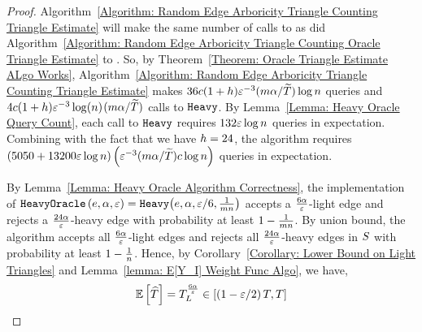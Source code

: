 \begin{proof}
    Algorithm~\ref{Algorithm: Random Edge Arboricity Triangle Counting Triangle Estimate} will make the same number of calls to \heavyoracle{} as did Algorithm~\ref{Algorithm: Random Edge Arboricity Triangle Counting Oracle Triangle Estimate} to \exactheavyoracle{}. So, by Theorem~\ref{Theorem: Oracle Triangle Estimate ALgo Works}, Algorithm~\ref{Algorithm: Random Edge Arboricity Triangle Counting Triangle Estimate} makes $36c(1+h)\varepsilon^{-3}(m\alpha/\widetilde{T})\log n$ queries and $4c(1+h)\varepsilon^{-3}\log(n)$$(m\alpha/\widetilde{T})$ calls to $\texttt{Heavy}{}$. By Lemma~\ref{Lemma: Heavy Oracle Query Count}, each call to $\texttt{Heavy}{}$ requires $132\varepsilon\log n$ queries in expectation. Combining with the fact that we have $h = 24$, the algorithm requires $\left({5050+13200\varepsilon\log n}\right)\left({\varepsilon^{-3} (m\alpha/\widetilde{T}) c\log n}\right)$ queries in expectation.

    By Lemma~\ref{Lemma: Heavy Oracle Algorithm Correctness}, the implementation of $\texttt{HeavyOracle}\left({e,\alpha,\varepsilon}\right) = \texttt{Heavy}{\left({e,\alpha,\varepsilon/6,\frac{1}{mn}}\right)}$  accepts a $\frac{6\alpha}{\varepsilon}$-light edge and rejects a $\frac{24\alpha}{\varepsilon}$-heavy edge with probability at least $1 - \frac{1}{mn}$. By union bound, the algorithm accepts all $\frac{6\alpha}{\varepsilon}$-light edges and rejects all $\frac{24\alpha}{\varepsilon}$-heavy edges in $S$ with probability at least $1-\frac{1}{n}$. Hence, by Corollary~\ref{Corollary: Lower Bound on Light Triangles} and Lemma~\ref{lemma: E[Y_I] Weight Func Algo}, we have, 
    \begin{align}
    \operatorname*{\mathbb{E}}\left[{\widehat{T}}\right] = T^{\frac{6\alpha}{\varepsilon}}_{L} \in \left[{\left({1-\varepsilon/2}\right)T,T}\right] \label{Eq:Final Light Triangle Bound}
    \end{align}


\end{proof}
